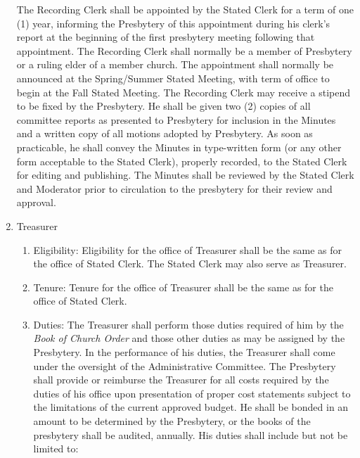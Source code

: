 \documentclass[
]{book}
\providecommand{\tightlist}{%
  \setlength{\itemsep}{0pt}\setlength{\parskip}{0pt}}
\begin{document}
\begin{enumerate}
  The Recording Clerk shall be appointed by the Stated Clerk for a term of one (1) year, informing the Presbytery of this appointment during his clerk's report at the beginning of the first presbytery meeting following that appointment. The Recording Clerk shall normally be a member of Presbytery or a ruling elder of a member church. The appointment shall normally be announced at the Spring/Summer Stated Meeting, with term of office to begin at the Fall Stated Meeting. The Recording Clerk may receive a stipend to be fixed by the Presbytery. He shall be given two (2) copies of all committee reports as presented to Presbytery for inclusion in the Minutes and a written copy of all motions adopted by Presbytery. As soon as practicable, he shall convey the Minutes in type-written form (or any other form acceptable to the Stated Clerk), properly recorded, to the Stated Clerk for editing and publishing. The Minutes shall be reviewed by the Stated Clerk and Moderator prior to circulation to the presbytery for their review and approval.
\item
  Treasurer

  \begin{enumerate}
  \def\labelenumii{\arabic{enumii}.}
  \tightlist
  \item
    Eligibility: Eligibility for the office of Treasurer shall be the same as for the office of Stated Clerk. The Stated Clerk may also serve as Treasurer.
  \item
    Tenure: Tenure for the office of Treasurer shall be the same as for the office of Stated Clerk.
  \item
    Duties: The Treasurer shall perform those duties required of him by the \emph{Book of Church Order} and those other duties as may be assigned by the Presbytery. In the performance of his duties, the Treasurer shall come under the oversight of the Administrative Committee. The Presbytery shall provide or reimburse the Treasurer for all costs required by the duties of his office upon presentation of proper cost statements subject to the limitations of the current approved budget. He shall be bonded in an amount to be determined by the Presbytery, or the books of the presbytery shall be audited, annually. His duties shall include but not be limited to:


\end{enumerate}
\end{enumerate}
\end{document}
